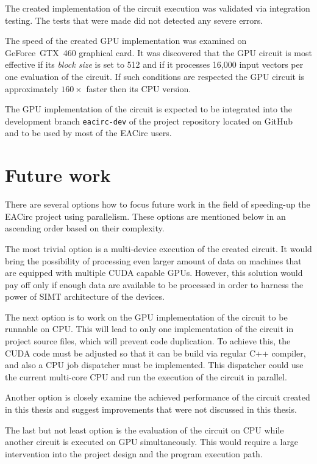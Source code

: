 \documentclass[12pt,twoside]{fithesis2}
\begin{document}
The created implementation of the circuit execution was validated via integration testing. The tests that were made did not detected any severe errors.

The speed of the created GPU implementation was examined on GeForce~GTX~460 graphical card. It was discovered that the GPU circuit is most effective if its \emph{block size} is set to 512 and if it processes 16,000 input vectors per one evaluation of the circuit. If such conditions are respected the GPU circuit is approximately $160\times$ faster then its CPU version.

The GPU implementation of the circuit is expected to be integrated into the development branch \texttt{eacirc-dev} of the project repository located on GitHub~\cite{eacirc_repo} and to be used by most of the EACirc users.

\section{Future work}

There are several options how to focus future work in the field of speeding-up the EACirc project using parallelism. These options are mentioned below in an ascending order based on their complexity.

The most trivial option is a multi-device execution of the created circuit. It would bring the possibility of processing even larger amount of data on machines that are equipped with multiple CUDA capable GPUs. However, this solution would pay off only if enough data are available to be processed in order to harness the power of SIMT architecture of the devices.

The next option is to work on the GPU implementation of the circuit to be runnable on CPU. This will lead to only one implementation of the circuit in project source files, which will prevent code duplication. To achieve this, the CUDA code must be adjusted so that it can be build via regular C++ compiler, and also a CPU job dispatcher must be implemented. This dispatcher could use the current multi-core CPU and run the execution of the circuit in parallel.

Another option is closely examine the achieved performance of the circuit created in this thesis and suggest improvements that were not discussed in this thesis.

The last but not least option is the evaluation of the circuit on CPU while another circuit is executed on GPU simultaneously. This would require a large intervention into the project design and the program execution path.
\end{document}
